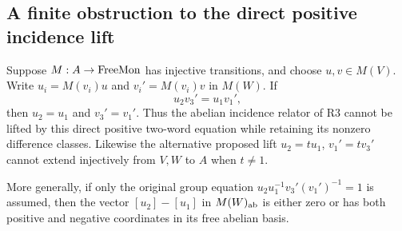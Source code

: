 \subsection{A finite obstruction to the direct positive incidence lift}

\begin{proposition}
\label{G:positiveincidence}
Suppose $M:A\to\mathrm{FreeMon}$ has injective transitions, and choose
$u,v\in M(V)$.  Write $u_i=M(v_i)u$ and $v_i'=M(v_i)v$ in
$M(W)$.  If
\[
 u_2v_3'=u_1v_1',
 \tag{G.9}
\]
then $u_2=u_1$ and $v_3'=v_1'$.
Thus the abelian incidence relator of R3 cannot be lifted by
this direct positive two-word equation while retaining its
nonzero difference classes.  Likewise the alternative proposed
lift $u_2=t u_1$, $v_1'=t v_3'$ cannot extend injectively from
$V,W$ to $A$ when $t\ne1$.

More generally, if only the original group equation
$u_2u_1^{-1}v_3'(v_1')^{-1}=1$ is assumed, then the vector
$[u_2]-[u_1]$ in $M(W)_{\mathrm{ab}}$ is either zero or has both
positive and negative coordinates in its free abelian basis.
\end{proposition}
